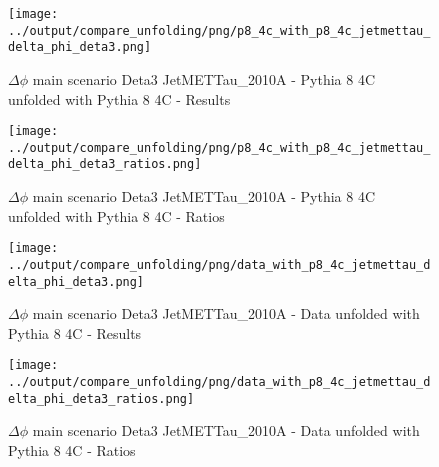 \documentclass[11pt]{book}
\begin{document}
\begin{figure}[ht]
\centering
\texttt{[image: ../output/compare\_unfolding/png/p8\_4c\_with\_p8\_4c\_jetmettau\_delta\_phi\_deta3.png]}
\caption{$\Delta\phi$ main scenario Deta3 JetMETTau\_2010A - Pythia 8 4C unfolded with Pythia 8 4C - Results}
\label{p8_p8_jetmettau_delta_phi_deta3_a}
\end{figure}

\begin{figure}[ht]
\centering
\texttt{[image: ../output/compare\_unfolding/png/p8\_4c\_with\_p8\_4c\_jetmettau\_delta\_phi\_deta3\_ratios.png]}
\caption{$\Delta\phi$ main scenario Deta3 JetMETTau\_2010A - Pythia 8 4C unfolded with Pythia 8 4C - Ratios}
\label{p8_p8_jetmettau_delta_phi_deta3_b}
\end{figure}

\begin{comment}

\begin{figure}[ht]
\centering
\texttt{[image: ../output/compare\_unfolding/png/p6\_z2\_with\_p8\_4c\_jetmettau\_delta\_phi\_deta3.png]}
\caption{$\Delta\phi$ main scenario Deta3 JetMETTau\_2010A - Pythia 6 Z2* unfolded with Pythia 8 4C - Results}
\label{p6_p8_jetmettau_delta_phi_deta3_a}
\end{figure}

\begin{figure}[ht]
\centering
\texttt{[image: ../output/compare\_unfolding/png/p6\_z2\_with\_p8\_4c\_jetmettau\_delta\_phi\_deta3\_ratios.png]}
\caption{$\Delta\phi$ main scenario Deta3 JetMETTau\_2010A - Pythia 6 Z2* unfolded with Pythia 8 4C - Ratios}
\label{p6_p8_jetmettau_delta_phi_deta3_b}
\end{figure}

\end{comment}


\begin{figure}[ht]
\centering
\texttt{[image: ../output/compare\_unfolding/png/data\_with\_p8\_4c\_jetmettau\_delta\_phi\_deta3.png]}
\caption{$\Delta\phi$ main scenario Deta3 JetMETTau\_2010A - Data unfolded with Pythia 8 4C - Results}
\label{data_p8_jetmettau_delta_phi_deta3_a}
\end{figure}

\begin{figure}[ht]
\centering
\texttt{[image: ../output/compare\_unfolding/png/data\_with\_p8\_4c\_jetmettau\_delta\_phi\_deta3\_ratios.png]}
\caption{$\Delta\phi$ main scenario Deta3 JetMETTau\_2010A - Data unfolded with Pythia 8 4C - Ratios}
\label{data_p8_jetmettau_delta_phi_deta3_b}
\end{figure}
\end{document}

